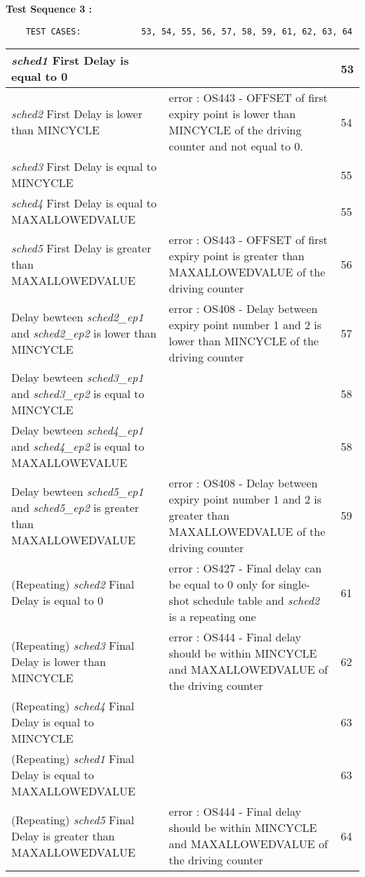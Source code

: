 \documentclass[10pt]{article}
\newlength{\Li}\settowidth{\Li}{Running}
\newlength{\Lii}\setlength{\Lii}{7cm}
\newlength{\Liiii}\setlength{\Liiii}{0.9cm}
\newlength{\Liii}\setlength{\Liii}{\textwidth} \addtolength{\Liii}{-\Li} \addtolength{\Liii}{-\Lii} \addtolength{\Liii}{-\Liiii}
\begin{document}
	\textbf{Test Sequence 3 :}
	\begin{lstlisting}
	TEST CASES:		       53, 54, 55, 56, 57, 58, 59, 61, 62, 63, 64
	\end{lstlisting}
	

	\begin{supertabular}{|p{\Li}|p{\Lii}|p{\Liii}|} \hline 
	\textit{sched1} First Delay is equal to 0						& 																						& 53 \\ \hline
	\textit{sched2} First Delay is lower than MINCYCLE				& error : OS443 - OFFSET of first expiry point is lower than MINCYCLE of the driving counter and not equal to 0.	& 54 \\ \hline
	\textit{sched3} First Delay is equal to MINCYCLE				& 																						& 55 \\ \hline
	\textit{sched4} First Delay is equal to MAXALLOWEDVALUE		& 																						& 55 \\ \hline
	\textit{sched5} First Delay is greater than MAXALLOWEDVALUE	& error : OS443 - OFFSET of first expiry point is greater than MAXALLOWEDVALUE of the driving counter 		& 56 \\ \hline
	Delay bewteen \textit{sched2\_ep1} and \textit{sched2\_ep2}  is lower than MINCYCLE	& error : OS408 - Delay between expiry point number 1 and 2 is lower than MINCYCLE of the driving counter & 57 \\ \hline
	Delay bewteen \textit{sched3\_ep1} and \textit{sched3\_ep2}  is equal to MINCYCLE	& 																					& 58 \\ \hline
	Delay bewteen \textit{sched4\_ep1} and \textit{sched4\_ep2}  is equal to MAXALLOWEVALUE	& 																			& 58 \\ \hline
	Delay bewteen \textit{sched5\_ep1} and \textit{sched5\_ep2}  is greater than MAXALLOWEDVALUE	& error : OS408 - Delay between expiry point number 1 and 2 is greater than MAXALLOWEDVALUE of the driving counter	& 59 \\ \hline
	(Repeating) \textit{sched2} Final Delay is equal to 0				& error : OS427 - Final delay can be equal to 0 only for single-shot schedule table and \textit{sched2} is a repeating one		& 61 \\ \hline
	(Repeating) \textit{sched3} Final Delay is lower than MINCYCLE	& error : OS444 - Final delay should be within MINCYCLE and MAXALLOWEDVALUE of the driving counter				& 62 \\ \hline	
	(Repeating) \textit{sched4} Final Delay is equal to MINCYCLE	& 																									& 63 \\ \hline	
	(Repeating) \textit{sched1} Final Delay is equal to MAXALLOWEDVALUE	&																						& 63 \\ \hline	
	(Repeating) \textit{sched5} Final Delay is greater than MAXALLOWEDVALUE & error : OS444 - Final delay should be within MINCYCLE and MAXALLOWEDVALUE of the driving counter		& 64 \\ \hline
	\end{supertabular}\\
\end{document}
